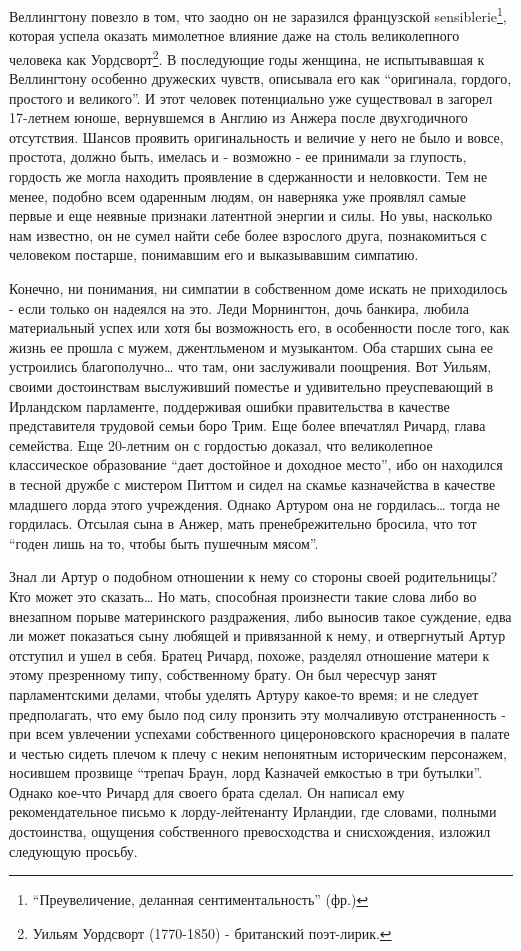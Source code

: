 \documentclass[
  oneside,
  12pt,
  titlepage]{book}
\begin{document}
Веллингтону повезло в том, что заодно он не заразился французской sensiblerie\footnote{``Преувеличение, деланная сентиментальность'' (фр.)}, которая успела оказать мимолетное влияние даже на столь великолепного человека как Уордсворт\footnote{Уильям Уордсворт (1770-1850) - британский поэт-лирик.}. В последующие годы женщина, не испытывавшая к Веллингтону особенно дружеских чувств, описывала его как ``оригинала, гордого, простого и великого''. И этот человек потенциально уже существовал в загорел 17-летнем юноше, вернувшемся в Англию из Анжера после двухгодичного отсутствия. Шансов проявить оригинальность и величие у него не было и вовсе, простота, должно быть, имелась и - возможно - ее принимали за глупость, гордость же могла находить проявление в сдержанности и неловкости. Тем не менее, подобно всем одаренным людям, он наверняка уже проявлял самые первые и еще неявные признаки латентной энергии и силы. Но увы, насколько нам известно, он не сумел найти себе более взрослого друга, познакомиться с человеком постарше, понимавшим его и выказывавшим симпатию.

Конечно, ни понимания, ни симпатии в собственном доме искать не приходилось - если только он надеялся на это. Леди Морнингтон, дочь банкира, любила материальный успех или хотя бы возможность его, в особенности после того, как жизнь ее прошла с мужем, джентльменом и музыкантом. Оба старших сына ее устроились благополучно\ldots{} что там, они заслуживали поощрения. Вот Уильям, своими достоинствам выслуживший поместье и удивительно преуспевающий в Ирландском парламенте, поддерживая ошибки правительства в качестве представителя трудовой семьи боро Трим. Еще более впечатлял Ричард, глава семейства. Еще 20-летним он с гордостью доказал, что великолепное классическое образование ``дает достойное и доходное место'', ибо он находился в тесной дружбе с мистером Питтом и сидел на скамье казначейства в качестве младшего лорда этого учреждения. Однако Артуром она не гордилась\ldots{} тогда не гордилась. Отсылая сына в Анжер, мать пренебрежительно бросила, что тот ``годен лишь на то, чтобы быть пушечным мясом''.

Знал ли Артур о подобном отношении к нему со стороны своей родительницы? Кто может это сказать\ldots{} Но мать, способная произнести такие слова либо во внезапном порыве материнского раздражения, либо выносив такое суждение, едва ли может показаться сыну любящей и привязанной к нему, и отвергнутый Артур отступил и ушел в себя. Братец Ричард, похоже, разделял отношение матери к этому презренному типу, собственному брату. Он был чересчур занят парламентскими делами, чтобы уделять Артуру какое-то время; и не следует предполагать, что ему было под силу пронзить эту молчаливую отстраненность - при всем увлечении успехами собственного цицероновского красноречия в палате и честью сидеть плечом к плечу с неким непонятным историческим персонажем, носившем прозвище ``трепач Браун, лорд Казначей емкостью в три бутылки''. Однако кое-что Ричард для своего брата сделал. Он написал ему рекомендательное письмо к лорду-лейтенанту Ирландии, где словами, полными достоинства, ощущения собственного превосходства и снисхождения, изложил следующую просьбу.
\end{document}
